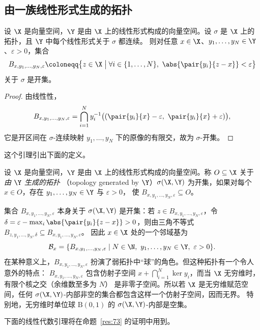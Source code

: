\subsection{由一族线性形式生成的拓扑}

\begin{lemma}
\label{res:72}
设 $\X$ 是向量空间，$\Y$ 是由 $\X$ 上的线性形式构成的向量空间。设 $\sigma$ 是 $\X$ 上的拓扑，且 $\Y$ 中每个线性形式关于 $\sigma$ 都连续。
则对任意 $x\in\X$、$y_1,\dots,y_N\in\Y$、$\varepsilon>0$，集合
\[
  B_{x,y_1,\dots,y_N,\varepsilon}\coloneqq\bigl\{z\in\X\bigm|\forall i\in\{1,\dots,N\},\ \abs{\pair{y_i}{z-x}}<\varepsilon\bigr\}
\]
关于 $\sigma$ 是开集。
\end{lemma}

\begin{proof}
由线性性，
\[
  B_{x,y_1,\dots,y_N,\varepsilon}=\bigcap_{i=1}^N y_i^{-1}\bigl((\pair{y_i}{x}-\varepsilon,\ \pair{y_i}{x}+\varepsilon)\bigr),
\]
它是开区间在 $\sigma$-连续映射 $y_1,\dots,y_N$ 下的原像的有限交，故为 $\sigma$-开集。
\end{proof}

这个引理引出下面的定义。

\begin{definition}[由线性形式生成的拓扑]
\label{def:37}
设 $\X$ 是向量空间，$\Y$ 是由 $\X$ 上的线性形式构成的向量空间。称 $O\subseteq\X$ 关于\emph{由 $\Y$ 生成的拓扑}
（topology generated by $\Y$）$\sigma(\X,\Y)$ 为开集，如果对每个 $x\in O$，存在 $y_1,\dots,y_N\in\Y$ 与 $\varepsilon>0$，
使 $B_{x,y_1,\dots,y_N,\varepsilon}\subseteq O$。
\end{definition}

集合 $B_{x,y_1,\dots,y_N,\varepsilon}$ 本身关于 $\sigma(\X,\Y)$ 是开集：若 $z\in B_{x,y_1,\dots,y_N,\varepsilon}$，令
$\delta=\varepsilon-\max_i\abs{\pair{y_i}{z-x}}>0$，则由三角不等式 $B_{z,y_1,\dots,y_N,\delta}\subseteq B_{x,y_1,\dots,y_N,\varepsilon}$。
因此 $x\in\X$ 处的一个邻域基为
\[
  \mathcal{B}_x=\{B_{x,y_1,\dots,y_N,\varepsilon}\mid N\in\N,\ y_1,\dots,y_N\in\Y,\ \varepsilon>0\}.
\]
在某种意义上，$B_{x,y_1,\dots,y_N,\varepsilon}$ 扮演了弱拓扑中“球”的角色。但这种拓扑有一个令人意外的特点：
$B_{x,y_1,\dots,y_N,\varepsilon}$ 包含仿射子空间 $x+\bigcap_{i=1}^N\ker y_i$，而当 $\X$ 无穷维时，有限个核之交（余维数至多为 $N$）
是非零子空间。所以若 $\X$ 是无穷维赋范空间，任何 $\sigma(\X,\Y)$-内部非空的集合都包含这样一个仿射子空间，因而无界。
特别地，无穷维时单位球 $\mathrm{B}(0,1)$ 的 $\sigma(\X,\Y)$-内部是空集。

下面的线性代数引理将在命题~\ref{res:73} 的证明中用到。

